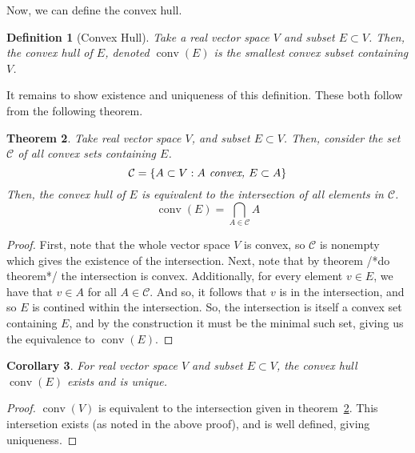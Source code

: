 \documentclass[12]{amsart}
\newtheorem{theorem}{Theorem}[section]
\newtheorem{definition}[theorem]{Definition}
\newtheorem{corollary}[theorem]{Corollary}
\newcommand{\todo}[1]{/*#1*/}
\DeclareMathOperator{\conv}{conv}
\begin{document}
Now, we can define the convex hull.
\begin{definition}[Convex Hull]
    Take a real vector space $V$ and subset $E \subset V$. Then, the \emph{convex hull} of $E$, denoted $\conv(E)$ is the smallest convex subset containing $V$.
\end{definition}
It remains to show existence and uniqueness of this definition. These both follow from the following theorem.
\begin{theorem}
    Take real vector space $V$, and subset $E \subset V$. Then, consider the set $\mathcal{C}$ of all convex sets containing $E$.
    \begin{equation*}
        \mathcal{C} = \{ A \subset V : A \text{\emph{ convex, }} E \subset A \}
    \end{equation*}
    Then, the convex hull of $E$ is equivalent to the intersection of all elements in $\mathcal{C}$.
    \begin{equation*}
        \conv(E) = \bigcap_{A \in \mathcal{C}} A
    \end{equation*}

\label{thm:conv_eq_int}
\end{theorem}
\begin{proof}
    First, note that the whole vector space $V$ is convex, so $\mathcal{C}$ is nonempty which gives the existence of the intersection. Next, note that by theorem \todo{do theorem} the intersection is convex. Additionally, for every element $v \in E$, we have that $v \in A$ for all $A \in \mathcal{C}$. And so, it follows that $v$ is in the intersection, and so $E$ is contined within the intersection. So, the intersection is itself a convex set containing $E$, and by the construction it must be the minimal such set, giving us the equivalence to $\conv(E)$.
\end{proof}
\begin{corollary}
    \label{cor:cv_ex_un}
    For real vector space $V$ and subset $E \subset V$, the convex hull $\conv(E)$ exists and is unique.
\end{corollary}
\begin{proof}
    $\conv(V)$ is equivalent to the intersection given in theorem~\ref{thm:conv_eq_int}. This intersetion exists (as noted in the above proof), and is well defined, giving uniqueness.
\end{proof}
\end{document}
